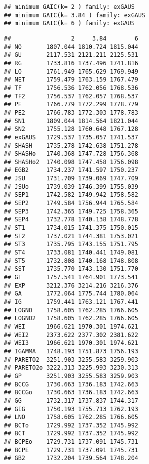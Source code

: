 \begin{Shaded}
\begin{Highlighting}[]
\OtherTok{\textless{}{-}} \NormalTok{, }\NormalTok{, }\NormalTok{)}
\end{Highlighting}
\end{Shaded}

\begin{verbatim}
## minimum GAIC(k= 2 ) family: exGAUS 
## minimum GAIC(k= 3.84 ) family: exGAUS 
## minimum GAIC(k= 6 ) family: exGAUS
\end{verbatim}

\begin{Shaded}
\begin{Highlighting}[]
\end{Highlighting}
\end{Shaded}

\begin{verbatim}
##                 2     3.84        6
## NO       1807.044 1810.724 1815.044
## GU       2117.531 2121.211 2125.531
## RG       1733.816 1737.496 1741.816
## LO       1761.949 1765.629 1769.949
## NET      1759.479 1763.159 1767.479
## TF       1756.536 1762.056 1768.536
## TF2      1756.537 1762.057 1768.537
## PE       1766.779 1772.299 1778.779
## PE2      1766.783 1772.303 1778.783
## SN1      1809.044 1814.564 1821.044
## SN2      1755.128 1760.648 1767.128
## exGAUS   1729.537 1735.057 1741.537
## SHASH    1735.278 1742.638 1751.278
## SHASHo   1740.368 1747.728 1756.368
## SHASHo2  1740.098 1747.458 1756.098
## EGB2     1734.237 1741.597 1750.237
## JSU      1731.709 1739.069 1747.709
## JSUo     1739.039 1746.399 1755.039
## SEP1     1742.582 1749.942 1758.582
## SEP2     1749.584 1756.944 1765.584
## SEP3     1742.365 1749.725 1758.365
## SEP4     1732.778 1740.138 1748.778
## ST1      1734.015 1741.375 1750.015
## ST2      1737.021 1744.381 1753.021
## ST3      1735.795 1743.155 1751.795
## ST4      1733.081 1740.441 1749.081
## ST5      1732.808 1740.168 1748.808
## SST      1735.770 1743.130 1751.770
## GT       1757.541 1764.901 1773.541
## EXP      3212.376 3214.216 3216.376
## GA       1772.064 1775.744 1780.064
## IG       1759.441 1763.121 1767.441
## LOGNO    1758.605 1762.285 1766.605
## LOGNO2   1758.605 1762.285 1766.605
## WEI      1966.621 1970.301 1974.621
## WEI2     2373.622 2377.302 2381.622
## WEI3     1966.621 1970.301 1974.621
## IGAMMA   1748.193 1751.873 1756.193
## PARETO2  3251.903 3255.583 3259.903
## PARETO2o 3222.313 3225.993 3230.313
## GP       3251.903 3255.583 3259.903
## BCCG     1730.663 1736.183 1742.663
## BCCGo    1730.663 1736.183 1742.663
## GG       1732.317 1737.837 1744.317
## GIG      1750.193 1755.713 1762.193
## LNO      1758.605 1762.285 1766.605
## BCTo     1729.992 1737.352 1745.992
## BCT      1729.992 1737.352 1745.992
## BCPEo    1729.731 1737.091 1745.731
## BCPE     1729.731 1737.091 1745.731
## GB2      1732.204 1739.564 1748.204
\end{verbatim}

